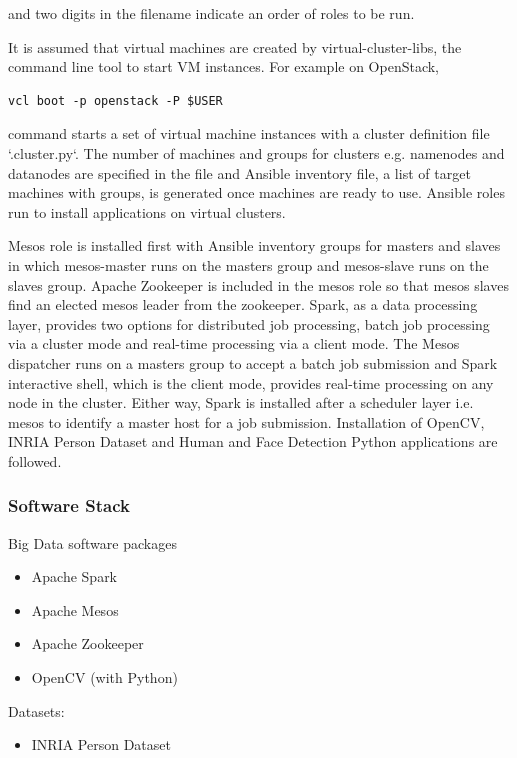 \documentclass[9pt,twocolumn,twoside]{styles/osajnl}
\begin{document}
and two digits in the filename indicate an order of roles to be run. 


It is assumed that virtual machines are created by
virtual-cluster-libs, the command line tool to start VM instances. For
example on OpenStack,

\begin{verbatim} 
vcl boot -p openstack -P $USER
\end{verbatim}

command starts a set of virtual machine instances with a cluster
definition file `.cluster.py`. The number of machines and groups for
clusters e.g. namenodes and datanodes are specified in the file and
Ansible inventory file, a list of target machines with groups, is
generated once machines are ready to use. Ansible roles run to install
applications on virtual clusters.


Mesos role is installed first with Ansible inventory groups for
masters and slaves in which mesos-master runs on the masters group and
mesos-slave runs on the slaves group. Apache Zookeeper is included in
the mesos role so that mesos slaves find an elected mesos leader from
the zookeeper. Spark, as a data processing layer, provides two options
for distributed job processing, batch job processing via a cluster
mode and real-time processing via a client mode. The Mesos dispatcher
runs on a masters group to accept a batch job submission and Spark
interactive shell, which is the client mode, provides real-time
processing on any node in the cluster. Either way, Spark is installed
after a scheduler layer i.e. mesos to identify a master host for a job
submission. Installation of OpenCV, INRIA Person Dataset and Human and
Face Detection Python applications are followed.


\subsubsection{Software Stack}

Big Data software packages

\begin{itemize}
\item Apache Spark
\item Apache Mesos
\item Apache Zookeeper
\item OpenCV (with Python)
\end{itemize}

Datasets:

\begin{itemize}
\item INRIA Person Dataset
\end{itemize}
\end{document}
